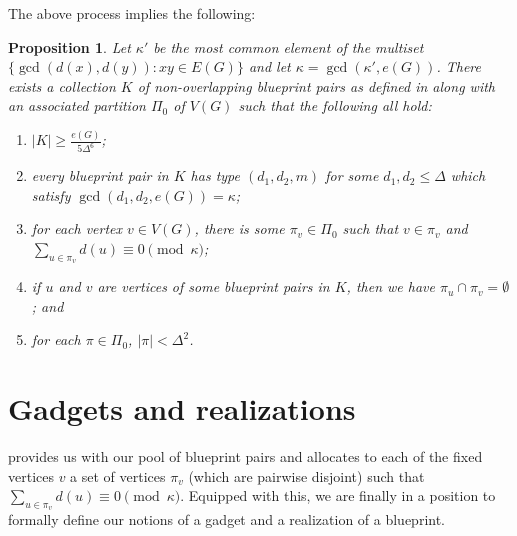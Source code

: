\documentclass{article}
\newtheorem{proposition}[theorem]{Proposition}
\theoremstyle{definition}
\begin{document}
 The above process implies the following:
\begin{proposition}\label{K_partition}
     Let $\kappa'$ be the most common element of the multiset $\{\gcd (d(x),d(y)): xy \in E(G)\}$ and let $\kappa = \gcd( \kappa', e(G))$. There exists a collection $K$ of non-overlapping blueprint pairs as defined in  along with an associated partition $\Pi_0$ of $V(G)$ such that the following all hold:
     \begin{enumerate}[label=\upshape{(\roman{enumi})}]
     \item $|K| \ge \frac{e(G)}{5\Delta ^6}$;
     \item every blueprint pair in $K$ has type $(d_1, d_2, m)$ for some $d_1, d_2\leq \Delta$ which satisfy $\gcd(d_1, d_2, e(G))=\kappa$;
     \item for each vertex $v \in V(G)$, there is some $\pi_v\in \Pi_0$ such that $v\in \pi_v$ and $\sum_{u\in \pi_v}d(u)\equiv 0\pmod \kappa$;
     \item if $u$ and $v$ are vertices of some blueprint pairs in $K$, then we have $\pi_u\cap \pi_v = \emptyset$; and
     \item for each $\pi\in \Pi_0$, $|\pi|<\Delta^2$.
     \end{enumerate}
 \end{proposition}



\section{Gadgets and realizations}\label{sec.gadgets}

 provides us with our pool of blueprint pairs and allocates to each of the fixed vertices $v$ a set of vertices $\pi_v$ (which are pairwise disjoint) such that $\sum_{u\in \pi_v} d(u) \equiv0\pmod \kappa$. Equipped with this, we are finally in a position to formally define our notions of a gadget and a realization of a blueprint.  
\end{document}
